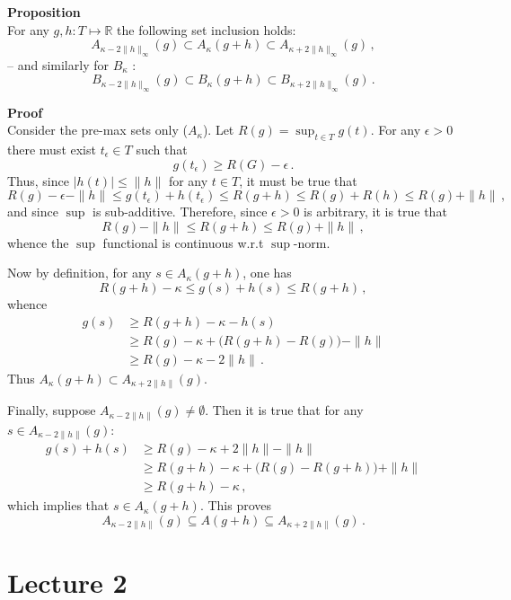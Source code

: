 \documentclass[a4paper]{article}
\newcommand{\Real}{\mathbb{R}}
\begin{document}
\noindent\textbf{Proposition}\hfill\\
For any $g, h:T\mapsto \Real$ the following set inclusion holds:
\[ A_{\kappa - 2\|h\|_\infty}(g) \subset A_\kappa(g+h)
                                 \subset A_{\kappa + 2\|h\|_\infty}(g)\,, \]
-- and similarly for $B_\kappa$ :
\[ B_{\kappa - 2\|h\|_\infty}(g) \subset B_\kappa(g+h)
                                 \subset B_{\kappa + 2\|h\|_\infty}(g)\,. \]

\noindent \textbf{Proof}\hfill\\
Consider the pre-max sets only ($A_\kappa$). Let $R(g) = \sup_{t\in T} g(t)$.
For any $\epsilon>0$ there must exist $t_\epsilon\in T$ such that
\[ g(t_\epsilon) \geq R(G) - \epsilon \,. \]
Thus, since $|h(t)| \leq \|h\|$ for any $t\in T$, it must be true that
\[ R(g) - \epsilon - \|h\| \leq g(t_\epsilon) + h(t_\epsilon)
                           \leq R(g + h)
                           \leq R(g) + R(h)
                           \leq R(g) + \|h\|\,,
\]
and since $\sup$ is sub-additive. Therefore, since $\epsilon>0$ is arbitrary,
it is true that
\[ R(g) - \|h\| \leq R(g + h) \leq R(g) + \|h\|\,, \]
whence the $\sup$ functional is continuous w.r.t $\sup$-norm.

Now by definition, for any $s\in A_\kappa(g+h)$, one has
\[ R(g+h) - \kappa \leq g(s)+h(s) \leq R(g+h)\,, \]
whence
\begin{align*}
g(s) & \geq R(g+h) - \kappa - h(s) \\
     & \geq R(g) - \kappa + \bigl(R(g+h) - R(g)\bigr) - \|h\|\\
     & \geq R(g) - \kappa - 2\|h\|\,.
\end{align*}
Thus $A_\kappa(g+h) \subset A_{\kappa + 2\|h\|}(g)$.

Finally, suppose $A_{\kappa-2\|h\|}(g) \neq \emptyset$. Then it is true that
for any $s\in A_{\kappa-2\|h\|}(g)$:
\begin{align*}
g(s) + h(s) & \geq R(g) - \kappa + 2\|h\| - \|h\| \\
            & \geq R(g+h) - \kappa + \bigl( R(g) - R(g+h) \bigr) + \|h\|\\
            & \geq R(g+h) - \kappa \,,
\end{align*}
which implies that $s\in A_\kappa(g+h)$. This proves
\[ A_{\kappa-2\|h\|}(g)\subseteq A(g+h) \subseteq A_{\kappa+2\|h\|}(g) \,.\]



\section{Lecture 2} %
\label{sec:lecture_2}
\end{document}
